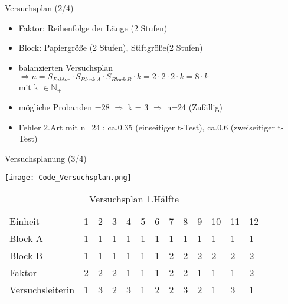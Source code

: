 \documentclass[ ngerman, fontsize= 10pt, headings=big, titlepage=true]{beamer}
\begin{document}
\begin{frame}{Versuchsplan (2/4)}
	
	
	\begin{itemize}
		\item Faktor: Reihenfolge der Länge (2 Stufen)
		\item Block: Papiergröße (2 Stufen), Stiftgröße(2 Stufen)	
		\item balanzierten Versuchsplan\\
		 $\Rightarrow n = S_{Faktor} \cdot S_{Block\ A} \cdot  S_{Block\ B} \cdot k =2 \cdot 2\cdot 2\cdot k = 8\cdot k$ \\
		 mit k $\in \mathbb{N}_+$
		
		\item mögliche Probanden =28 $\Rightarrow$ k = 3 $\Rightarrow$ n=24 (Zufällig)
		\item Fehler 2.Art mit n=24 : ca.0.35 (einseitiger t-Test), ca.0.6 (zweiseitiger t-Test)
		
		
	\end{itemize}
	
\end{frame}
\begin{frame}{Versuchsplanung (3/4)}
	
\texttt{[image: Code\_Versuchsplan.png]}

{\small
\begin{table}[hb]
	\caption{Versuchsplan 1.Hälfte}
	\centering
	\begin{tabular}[b]{l||l|l|l|l|l|l|l|l|l|l|l|l}
		\hline
		Einheit & 1 & 2 & 3 & 4 & 5 & 6 & 7 & 8 & 9 & 10 & 11 & 12\\
		\hhline{=============}
		Block A & 1 & 1 & 1 & 1 & 1 & 1 & 1 & 1 & 1 & 1 & 1 & 1\\
		\hline
		Block B & 1 & 1 & 1 & 1 & 1 & 1 & 2 & 2 & 2 & 2 & 2 & 2\\
		\hline
		Faktor & 2 & 2 & 2 & 1 & 1 & 1 & 2 & 2 & 1 & 1 & 1 & 2\\
		\hhline{=============}
		{\tiny Versuchsleiterin} & 1 & 3 & 2 & 3 & 1 & 2 & 2 & 3 & 2 & 1 & 3 & 1\\
		\hline
	\end{tabular}
\end{table}}

\end{frame}
\end{document}
